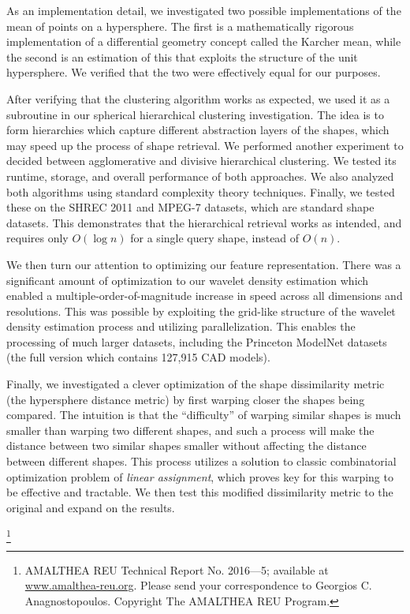 \documentclass[../tech_report_1.tex]{subfiles}
\newcommand\blfootnote[1]{%
  \begingroup
  \renewcommand\thefootnote{}\footnote{#1}%
  \addtocounter{footnote}{-1}%
  \endgroup
}
\begin{document}
As an implementation detail, we investigated two possible implementations of the mean of points on a hypersphere. The first is a mathematically rigorous implementation of a differential geometry concept called the Karcher mean, while the second is an estimation of this that exploits the structure of the unit hypersphere. We verified that the two were effectively equal for our purposes.

After verifying that the clustering algorithm works as expected, we used it as a subroutine in our spherical hierarchical clustering investigation. The idea is to form hierarchies which capture different abstraction layers of the shapes, which may speed up the process of shape retrieval. We performed another experiment to decided between agglomerative and divisive hierarchical clustering. We tested its runtime, storage, and overall performance of both approaches. We also analyzed both algorithms using standard complexity theory techniques. Finally, we tested these on the SHREC 2011 \cite{boyer2011shrec} and MPEG-7 \cite{bober2001mpeg} datasets, which are standard shape datasets. This demonstrates that the hierarchical retrieval works as intended, and requires only $O(\log n)$ for a single query shape, instead of $O(n)$.

We then turn our attention to optimizing our feature representation. There was a significant amount of optimization to our wavelet density estimation which enabled a multiple-order-of-magnitude increase in speed across all dimensions and resolutions. This was possible by exploiting the grid-like structure of the wavelet density estimation process and utilizing parallelization. This enables the processing of much larger datasets, including the Princeton ModelNet datasets (the full version which contains 127,915 CAD models).

Finally, we investigated a clever optimization of the shape dissimilarity metric (the hypersphere distance metric) by first warping closer the shapes being compared. The intuition is that the ``difficulty'' of warping similar shapes is much smaller than warping two different shapes, and such a process will make the distance between two similar shapes smaller without affecting the distance between different shapes. This process utilizes a solution to classic combinatorial optimization problem of \textit{linear assignment}, which proves key for this warping to be effective and tractable. We then test this modified dissimilarity metric to the original and expand on the results.

\blfootnote{AMALTHEA REU Technical Report No. 2016–--5; available at \href{www.amalthea-reu.org}{www.amalthea-reu.org}. Please send your correspondence to Georgios C. Anagnostopoulos. Copyright \textcopyright \thickspace 2016 The AMALTHEA REU Program.}
\end{document}
